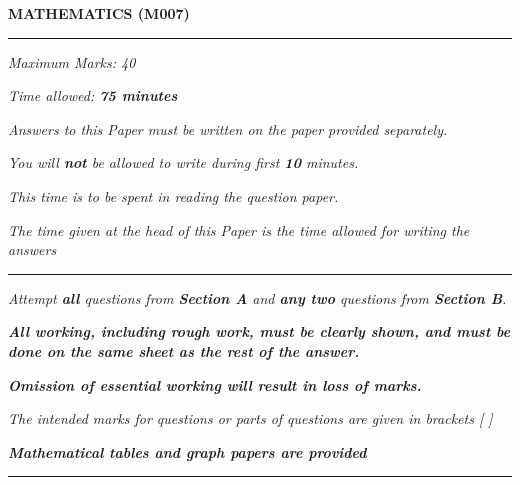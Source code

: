\begin{center}
   \Large
   \textbf{MATHEMATICS (M007)}
   \rule{\textwidth}{0.4pt}
   \normalsize
   \textit{Maximum Marks: 40}

   \textit{Time allowed: \textbf{75 minutes}}

   \textit{Answers to this Paper must be written on the paper provided separately.}

   \textit{You will \textbf{not} be allowed to write during first \textbf{10} minutes.}

   \textit{This time is to be spent in reading the question paper.}

   \textit{The time given at the head of this Paper is the time allowed for writing the answers}
   \rule{\textwidth}{0.4pt}
   \small

   \textit{Attempt \textbf{all} questions from \textbf{Section A} and \textbf{any two} questions from \textbf{Section B}.}

   \textit{\textbf{All working, including rough work, must be clearly shown, and must be done on the same sheet as the rest of the answer.}}

   \textit{\textbf{Omission of essential working will result in loss of marks.}}

   \textit{The intended marks for questions or parts of questions are given in brackets [ ]}

   \textit{\textbf{Mathematical tables and graph papers are provided}}
   \rule{\textwidth}{0.4pt}
\end{center}
